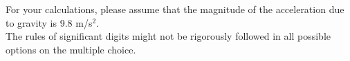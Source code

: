 \begin{center}
\gradetable[h][questions]
\end{center}
\noindent For your calculations, please assume that the magnitude of the acceleration due to gravity is 9.8 m/s$^2$.\\

\noindent The rules of significant digits might not be rigorously followed in all possible options on the multiple choice. 
\begin{questions}

\end{questions}



